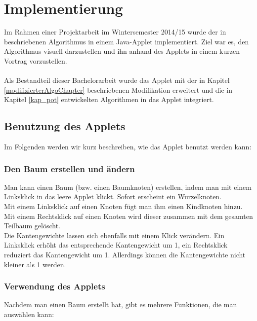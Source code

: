 \section{Implementierung}\label{kap_implementierung}

Im Rahmen einer Projektarbeit im Wintersemester 2014/15 wurde der in \cite{cima_paper} beschriebenen Algorithmus in einem Java-Applet implementiert. Ziel war es, den Algorithmus visuell darzustellen und ihn anhand des Applets in einem kurzen Vortrag vorzustellen.
\\
\\
Als Bestandteil dieser Bachelorarbeit wurde das Applet mit der in Kapitel \ref{modifizierterAlgoChapter} beschriebenen Modifikation erweitert und die in Kapitel \ref{kap_pot} entwickelten Algorithmen in das Applet integriert.


\subsection*{Benutzung des Applets}

Im Folgenden werden wir kurz beschreiben, wie das Applet benutzt werden kann:

\subsubsection*{Den Baum erstellen und ändern}

Man kann einen Baum (bzw. einen Baumknoten) erstellen, indem man mit einem Linksklick in das leere Applet klickt. Sofort erscheint ein Wurzelknoten.\\
Mit einem Linksklick auf einen Knoten fügt man ihm einen Kindknoten hinzu. Mit einem Rechtsklick auf einen Knoten wird dieser zusammen mit dem gesamten Teilbaum gelöscht.\\
Die Kantengewichte lassen sich ebenfalls mit einem Klick verändern. Ein Linksklick erhöht das entsprechende Kantengewicht um 1, ein Rechtsklick reduziert das Kantengewicht um 1. Allerdings können die Kantengewichte nicht kleiner als 1 werden.


\subsubsection*{Verwendung des Applets}

Nachdem man einen Baum erstellt hat, gibt es mehrere Funktionen, die man auswählen kann:\\

